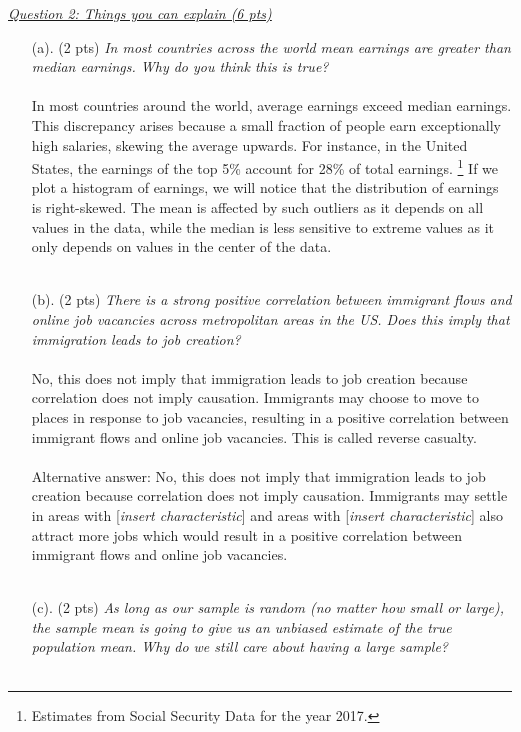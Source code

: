 \documentclass{./../../Latex/tests}
\begin{document}
\newpage 
\underline{\textit{Question 2: Things you can explain (6 pts)}} \\
\begin{enumerate}
\item[(a).] (2 pts) \textit{In most countries across the world mean earnings are greater than median earnings. Why do you think this is true?}  \\~\\
In most countries around the world, average earnings exceed median earnings. This discrepancy arises because a small fraction of people earn exceptionally high salaries, skewing the average upwards. For instance, in the United States, the earnings of the top 5\% account for 28\% of total earnings. \footnote{Estimates from Social Security Data for the year 2017.}  If we plot a histogram of earnings, we will notice that the distribution of earnings is right-skewed. The mean is affected by such outliers as it depends on all values in the data, while the median is less sensitive to extreme values as it only depends on values in the center of the data. \\~\\
\item[(b).] (2 pts) \textit{There is a strong positive correlation between immigrant flows and online job vacancies across metropolitan areas in the US. Does this imply that immigration leads to job creation? } \\~\\
No, this does not imply that immigration leads to job creation because correlation does not imply causation. Immigrants may choose to move to places in response to job vacancies, resulting in a positive correlation between immigrant flows and online job vacancies. This is called reverse casualty. \\~\\
Alternative answer: No, this does not imply that immigration leads to job creation because correlation does not imply causation. Immigrants may settle in areas with [\textit{insert characteristic}] and areas with [\textit{insert characteristic}] also attract more jobs which would result in a positive correlation between immigrant flows and online job vacancies. \\~\\
\item[(c).] (2 pts) \textit{As long as our sample is random (no matter how small or large), the sample mean is going to give us an unbiased estimate of the true population mean. Why do we still care about having a large sample?} \\~\\

\end{enumerate}
\end{document}
